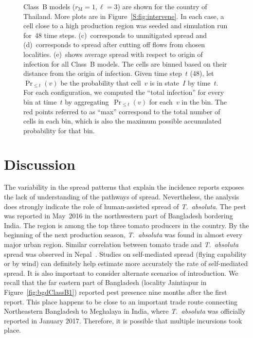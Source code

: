 \documentclass[11pt]{article}
\newcommand{\tuta}{\emph{T.~absoluta}}
\newcommand{\mooreRange}{r_\mathrm{M}}
\theoremstyle{definition}
\begin{document}
\begin{figure}[ht]
{Class~B models ($\mooreRange=1, \ell=3$) are shown for the country of
Thailand. More plots are in Figure~\ref{S:fig:intervene}. In each case, a
cell close to a high production region was seeded and simulation run for~48
time steps. (c)~corresponds to unmitigated spread and (d)~corresponds to
spread after cutting off flows from chosen localities. (e)~shows average
spread with respect to origin of infection for all Class~B models. The
cells are binned based on their distance from the origin of infection.
Given time step~$t$ (48), let $\Pr_{\le t}(v)$ be the probability that
cell~$v$ is in state~$I$ by time~$t$. For each configuration, we computed
the ``total infection'' for every bin at time~$t$ by aggregating~$\Pr_{\le
t}(v)$ for each~$v$ in the bin. The red points referred to as ``max''
correspond to the total number of cells in each bin, which is also the
maximum possible accumulated probability for that bin.
\label{fig:spread}}
\end{figure}

\section{Discussion}
The variability in the spread patterns that explain the incidence reports
exposes the lack of understanding of the pathways of spread.  Nevertheless,
the analysis does strongly indicate the role of human-assisted spread of
\tuta{}. The pest was reported in May~2016 in the northwestern part of
Bangladesh bordering India. The region is among the top three tomato
producers in the country. By the beginning of the next production season,
\tuta{} was found in almost every major urban region.  Similar correlation
between tomato trade and \tuta{} spread was observed in
Nepal~\cite{venkatramanan2019modeling}. Studies on self-mediated spread
(flying capability or by wind) can definitely help estimate more accurately
the rate of self-mediated spread. It is also important to consider
alternate scenarios of introduction. We recall that the far eastern part of
Bangladesh (locality Jaintiapur in Figure~\ref{fig:bgdClassB1}) reported
pest presence nine months after the first report. This place happens to be
close to an important trade route connecting Northeastern Bangladesh to
Meghalaya in India, where \tuta{} was officially reported in January 2017.
Therefore, it is possible that multiple incursions took place. 
\end{document}
